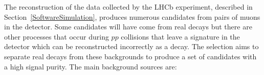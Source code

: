 The reconstruction of the data collected by the LHCb experiment, described in Section~\ref{SoftwareSimulation}, produces numerous \bmumu candidates from pairs of muons in the detector. Some candidates will have come from real \bmumu decays but there are other processes that occur during $pp$ collisions that leave a signature in the detector which can be reconstructed incorrectly as a \bmumu decay. %
The selection aims to separate real \bmumu decays from these backgrounds to produce a set of \bmumu candidates with a high signal purity. %
The main background sources are:
